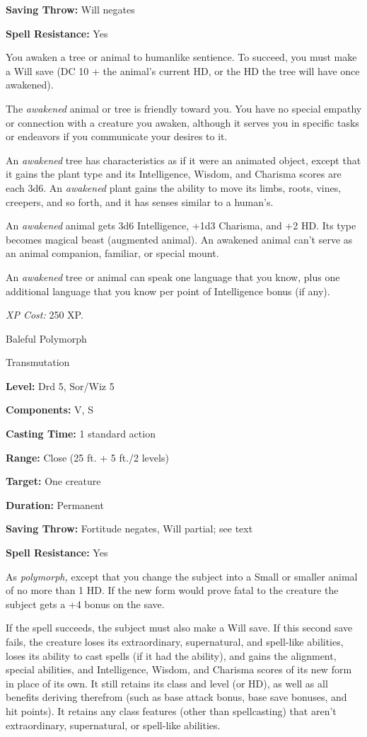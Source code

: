 \documentclass{article}
\begin{document}
\textbf{Saving Throw: }Will negates

\textbf{Spell Resistance:} Yes

You awaken a tree or animal to humanlike sentience. To succeed, you must make a 
Will save (DC 10 + the animal's current HD, or the HD the tree will have once awakened).

The \textit{awakened }animal or tree is friendly toward you. You have no special 
empathy or connection with a creature you awaken, although it serves you in specific 
tasks or endeavors if you communicate your desires to it.

An \textit{awakened }tree has characteristics as if it were an animated object, 
except that it gains the plant type and its Intelligence, Wisdom, and Charisma 
scores are each 3d6. An \textit{awakened }plant gains the ability to move its limbs, 
roots, vines, creepers, and so forth, and it has senses similar to a human's.

An \textit{awakened }animal gets 3d6 Intelligence, +1d3 Charisma, and +2 HD. Its 
type becomes magical beast (augmented animal). An awakened animal can't serve as 
an animal companion, familiar, or special mount.

An \textit{awakened }tree or animal can speak one language that you know, plus 
one additional language that you know per point of Intelligence bonus (if any).

\textit{XP Cost: }250 XP.

\vspace{12pt}
Baleful Polymorph

Transmutation

\textbf{Level:} Drd 5, Sor/Wiz 5

\textbf{Components:} V, S

\textbf{Casting Time:} 1 standard action

\textbf{Range:} Close (25 ft. + 5 ft./2 levels)

\textbf{Target:} One creature

\textbf{Duration:} Permanent

\textbf{Saving Throw:} Fortitude negates, Will partial; see text

\textbf{Spell Resistance:} Yes

As \textit{polymorph, }except that you change the subject into a Small or smaller 
animal of no more than 1 HD. If the new form would prove fatal to the creature 
the subject gets a +4 bonus on the save.

If the spell succeeds, the subject must also make a Will save. If this second save 
fails, the creature loses its extraordinary, supernatural, and spell-like abilities, 
loses its ability to cast spells (if it had the ability), and gains the alignment, 
special abilities, and Intelligence, Wisdom, and Charisma scores of its new form 
in place of its own. It still retains its class and level (or HD), as well as all 
benefits deriving therefrom (such as base attack bonus, base save bonuses, and 
hit points). It retains any class features (other than spellcasting) that aren't 
extraordinary, supernatural, or spell-like abilities.
\end{document}
